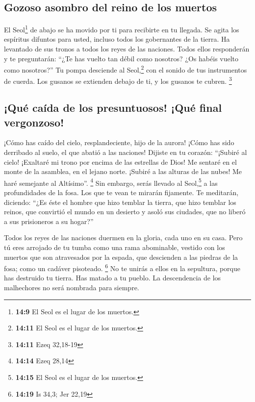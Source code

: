 \hypertarget{gozoso-asombro-del-reino-de-los-muertos}{%
\subsection{Gozoso asombro del reino de los
muertos}\label{gozoso-asombro-del-reino-de-los-muertos}}

 El Seol\footnote{\textbf{14:9} El Seol es el lugar de los
  muertos.} de abajo se ha movido por ti para recibirte en tu llegada.
Se agita los espíritus difuntos para usted, incluso todos los
gobernantes de la tierra. Ha levantado de sus tronos a todos los reyes
de las naciones.  Todos ellos responderán y te
preguntarán: ``¿Te has vuelto tan débil como nosotros? ¿Os habéis vuelto
como nosotros?''  Tu pompa desciende al Seol,\footnote{\textbf{14:11}
  El Seol es el lugar de los muertos.} con el sonido de tus instrumentos
de cuerda. Los gusanos se extienden debajo de ti, y los gusanos te
cubren. \footnote{\textbf{14:11} Ezeq 32,18-19}

\hypertarget{quuxe9-cauxedda-de-los-presuntuosos-quuxe9-final-vergonzoso}{%
\subsection{¡Qué caída de los presuntuosos! ¡Qué final
vergonzoso!}\label{quuxe9-cauxedda-de-los-presuntuosos-quuxe9-final-vergonzoso}}

 ¡Cómo has caído del cielo, resplandeciente, hijo de la
aurora! ¡Cómo has sido derribado al suelo, el que abatió a las naciones!
 Dijiste en tu corazón: ``¡Subiré al cielo! ¡Exaltaré mi
trono por encima de las estrellas de Dios! Me sentaré en el monte de la
asamblea, en el lejano norte.  ¡Subiré a las alturas de
las nubes! Me haré semejante al Altísimo''. \footnote{\textbf{14:14}
  Ezeq 28,14}  Sin embargo, serás llevado al
Seol,\footnote{\textbf{14:15} El Seol es el lugar de los muertos.} a las
profundidades de la fosa.  Los que te vean te mirarán
fijamente. Te meditarán, diciendo: ``¿Es éste el hombre que hizo temblar
la tierra, que hizo temblar los reinos,  que convirtió el
mundo en un desierto y asoló sus ciudades, que no liberó a sus
prisioneros a su hogar?''

 Todos los reyes de las naciones duermen en la gloria,
cada uno en su casa.  Pero tú eres arrojado de tu tumba
como una rama abominable, vestido con los muertos que son atravesados
por la espada, que descienden a las piedras de la fosa; como un cadáver
pisoteado. \footnote{\textbf{14:19} Is 34,3; Jer 22,19} 
No te unirás a ellos en la sepultura, porque has destruido tu tierra.
Has matado a tu pueblo. La descendencia de los malhechores no será
nombrada para siempre.

